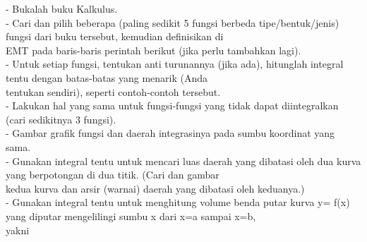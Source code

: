 \documentclass[12pt,Times new roman,letterpaper]{book}
\begin{document}
\begin{eulernootebook}
\begin{eulercomment}
\begin{eulercomment}
\begin{eulernootebook}
\begin{eulercomment}
\begin{eulercomment}
\begin{eulercomment}
\begin{eulercomment}
\begin{eulercomment}
\begin{eulercomment}
\begin{eulernotebook}
\begin{eulercomment}
\begin{eulercomment}
\begin{eulercomment}
\begin{eulercomment}
\begin{eulercomment}
\begin{eulercomment}
\begin{eulercomment}
\begin{eulercomment}
\begin{eulercomment}
\begin{eulercomment}
\begin{eulercomment}
\begin{eulercomment}
\begin{eulercomment}
\begin{eulercomment}
\begin{eulercomment}
\begin{eulercomment}
\begin{eulercomment}
\begin{eulercomment}
\begin{eulercomment}
\begin{eulercomment}
\begin{eulercomment}
\begin{eulercomment}
\begin{eulercomment}
- Bukalah buku Kalkulus.\\
- Cari dan pilih beberapa (paling sedikit 5 fungsi berbeda
tipe/bentuk/jenis) fungsi dari buku tersebut, kemudian definisikan di\\
EMT pada baris-baris perintah berikut (jika perlu tambahkan lagi).\\
- Untuk setiap fungsi, tentukan anti turunannya (jika ada), hitunglah
integral tentu dengan batas-batas yang menarik (Anda\\
tentukan sendiri), seperti contoh-contoh tersebut.\\
- Lakukan hal yang sama untuk fungsi-fungsi yang tidak dapat
diintegralkan (cari sedikitnya 3 fungsi).\\
- Gambar grafik fungsi dan daerah integrasinya pada sumbu koordinat
yang sama.\\
- Gunakan integral tentu untuk mencari luas daerah yang dibatasi oleh
dua kurva yang berpotongan di dua titik. (Cari dan gambar\\
kedua kurva dan arsir (warnai) daerah yang dibatasi oleh keduanya.)\\
- Gunakan integral tentu untuk menghitung volume benda putar kurva y=
f(x) yang diputar mengelilingi sumbu x dari x=a sampai x=b,\\
yakni


\end{eulercomment}
\end{eulercomment}
\end{eulercomment}
\end{eulercomment}
\end{eulercomment}
\end{eulercomment}
\end{eulercomment}
\end{eulercomment}
\end{eulercomment}
\end{eulercomment}
\end{eulercomment}
\end{eulercomment}
\end{eulercomment}
\end{eulercomment}
\end{eulercomment}
\end{eulercomment}
\end{eulercomment}
\end{eulercomment}
\end{eulercomment}
\end{eulercomment}
\end{eulercomment}
\end{eulercomment}
\end{eulercomment}
\end{eulernotebook}
\end{eulercomment}
\end{eulercomment}
\end{eulercomment}
\end{eulercomment}
\end{eulercomment}
\end{eulercomment}
\end{eulernootebook}
\end{eulercomment}
\end{eulercomment}
\end{eulernootebook}
\end{document}
